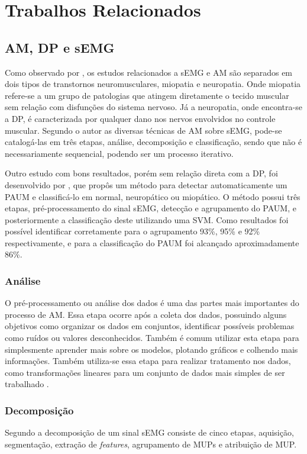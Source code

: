 \chapter{Trabalhos Relacionados}
\label{ch:TrabalhosRelacionados}

\section{AM, DP e sEMG}
Como observado por , os estudos relacionados a sEMG e AM são separados em  dois tipos de transtornos neuromusculares, miopatia e neuropatia. Onde miopatia refere-se a um grupo de patologias que atingem diretamente o tecido muscular sem relação com disfunções do sistema nervoso. Já a neuropatia, onde encontra-se a DP, é caracterizada por qualquer dano nos nervos envolvidos no controle muscular. Segundo o autor  as diversas técnicas de AM sobre sEMG, pode-se catalogá-las em três etapas, análise, decomposição e classificação, sendo que não é necessariamente sequencial, podendo ser um processo iterativo.

Outro estudo com bons resultados, porém sem relação direta com a DP, foi desenvolvido por , que propôs um método para detectar automaticamente um PAUM e classificá-lo em normal, neuropático ou miopático. O método possui três etapas, pré-processamento do sinal sEMG, detecção e agrupamento do PAUM, e posteriormente a classificação deste utilizando uma SVM. Como resultados foi possível identificar corretamente para o agrupamento 93\%, 95\% e 92\% respectivamente, e para a classificação do PAUM foi alcançado aproximadamente 86\%. 

\subsection{Análise}
O pré-processamento ou análise dos dados é uma das partes mais importantes do processo de AM. Essa etapa ocorre após a coleta dos dados, possuindo alguns objetivos como organizar os dados em conjuntos, identificar possíveis problemas como ruídos ou valores desconhecidos. Também é comum utilizar esta etapa para simplesmente aprender mais sobre os modelos, plotando gráficos e colhendo mais informações. Também utiliza-se essa etapa para realizar tratamento nos dados, como transformações lineares para um conjunto de dados mais simples de ser trabalhado \cite{batista2003pre}. 

\subsection{Decomposição}
Segundo  a decomposição de um sinal sEMG consiste de cinco etapas, aquisição, segmentação, extração de \textit{features}, agrupamento de MUPs e atribuição de MUP.

